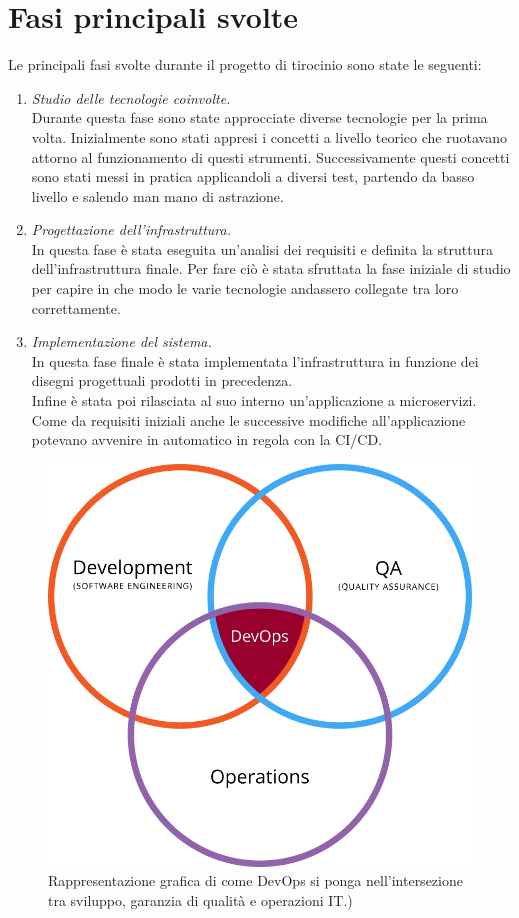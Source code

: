 \documentclass[a4paper,12pt]{report}
\begin{document}
\section{Fasi principali svolte}
Le principali fasi svolte durante il progetto di tirocinio sono state le seguenti:
\begin{enumerate}
\item \textit{Studio delle tecnologie coinvolte.} \\
Durante questa fase sono state approcciate diverse tecnologie per la prima volta. Inizialmente sono stati appresi i concetti a livello teorico che ruotavano attorno al funzionamento di questi strumenti. Successivamente questi concetti sono stati messi in pratica applicandoli a diversi test, partendo da basso livello e salendo man mano di astrazione.\\
\item \textit{Progettazione dell'infrastruttura.} \\
In questa fase è stata eseguita un'analisi dei requisiti e definita la struttura dell'infrastruttura finale. Per fare ciò è stata sfruttata la fase iniziale di studio per capire in che modo le varie tecnologie andassero collegate tra loro correttamente.
\item \textit{Implementazione del sistema.}\\
In questa fase finale è stata implementata l'infrastruttura in funzione dei disegni progettuali prodotti in precedenza.\\
Infine è stata poi rilasciata al suo interno un'applicazione a microservizi. \\
Come da requisiti iniziali anche le successive modifiche all'applicazione potevano avvenire in automatico in regola con la CI/CD. \\
\end{enumerate}
\begin{figure}[h]
	\includegraphics[width=1.0\textwidth]{def_devops}
    \caption{Rappresentazione grafica di come DevOps si ponga nell'intersezione tra sviluppo, garanzia di qualità e operazioni IT.) \cite{defdevops}}
    \label{fig:def_devops}
\end{figure}
\end{document}
